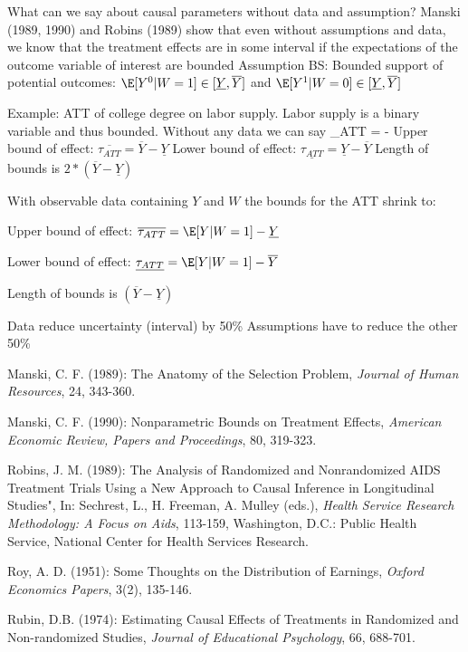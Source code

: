 \documentclass[
  25pt,         %
  a4paper,
  landscape,
  Screen4to3,
  footrule ]{foils}
\renewcommand{\pause}{}
\newcommand{\xx}{\item[{\small $\bullet$}]}
\begin{document}

\bi 
\x What can we say about causal parameters without data and assumption?
\x Manski (1989, 1990) and Robins (1989) show that even without assumptions and data, we know that the treatment effects are in some interval if the expectations of the outcome variable of interest are bounded
\x Assumption BS: Bounded support of potential outcomes: $\E[Y^0|W=1]\in[\underline{Y},\overline{Y}]$ and $\E[Y^1|W=0]\in[\underline{Y},\overline{Y}]$
\ei
\bi 

\x Example: ATT of college degree on labor supply. Labor supply is a binary variable and thus bounded. 
\x Without any data we can say
    \vsm
    \bea
    \tau_{ATT} = \E[Y^1|W=1] - \E[Y^0|W=1] \nonumber
    \eea
\x Upper bound of effect: $\overline{\tau_{ATT}} = \overline{Y} - \underline{Y}$
\x Lower bound of effect:   $\underline{\tau_{ATT}} = \underline{Y} - \overline{Y}$
\x Length of bounds is $2*(\overline{Y}-\underline{Y})$
\ei

\bi 

\x With observable data containing $Y$ and $W$ the bounds for the ATT shrink to:
\bi 
\xx Upper bound of effect: $\overline{\tau_{ATT}} =\E[Y|W=1] - \underline{Y}$
\xx Lower bound of effect:   $\underline{\tau_{ATT}} = \E[Y|W=1]- \overline{Y}$
\xx Length of bounds is $(\overline{Y}-\underline{Y})$
\ei
\pause
\x Data reduce uncertainty (interval) by 50\%
\vsm
\x Assumptions have to reduce the other 50\%
\ei


\begin{footnotesize}
\bi 
\x Manski, C. F. (1989): The Anatomy of the Selection Problem, \textit{Journal of Human Resources}, 24, 343-360.

\x Manski, C. F. (1990): Nonparametric Bounds on Treatment Effects, \textit{American Economic Review, Papers and Proceedings}, 80, 319-323.

\x Robins, J. M. (1989): The Analysis of Randomized and Nonrandomized AIDS Treatment Trials Using a New Approach to Causal Inference in Longitudinal Studies", In: Sechrest, L., H. Freeman, A. Mulley (eds.), \textit{Health Service Research Methodology: A Focus on Aids}, 113-159, Washington, D.C.: Public Health Service, National Center for Health Services Research.

\x Roy, A. D. (1951): Some Thoughts on the Distribution of Earnings, \textit{Oxford Economics Papers}, 3(2), 135-146.

\x Rubin, D.B. (1974): Estimating Causal Effects of Treatments in Randomized and Non-randomized Studies, \textit{Journal of Educational Psychology}, 66, 688-701.
\ei
\end{footnotesize}
\end{document}
